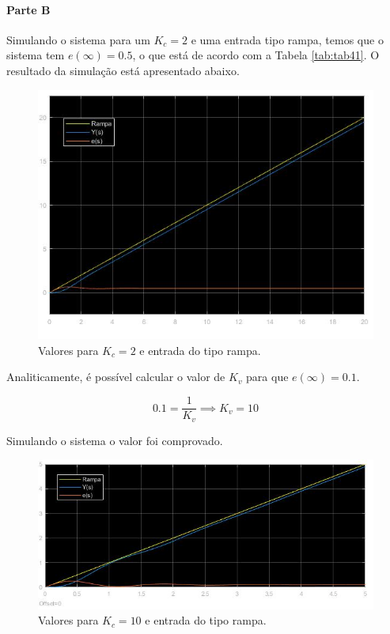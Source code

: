 \documentclass[
]{book}
\begin{document}
\hypertarget{parte-b-2}{%
\paragraph*{Parte B}\label{parte-b-2}}

Simulando o sistema para um \(K_c = 2\) e uma entrada tipo rampa, temos que o sistema tem \(e(\infty) = 0.5\), o que está de acordo com a Tabela \ref{tab:tab41}. O resultado da simulação está apresentado abaixo.

\begin{figure}
\includegraphics[width=0.8\linewidth]{Imagens/Lab4/Resolução/prob2B1} \caption{Valores para $K_c = 2$ e entrada do tipo rampa.}\label{fig:fig42B1}
\end{figure}

Analiticamente, é possível calcular o valor de \(K_v\) para que \(e(\infty) = 0.1\).

\[
0.1 = \frac {1}{K_v} \implies K_v = 10
\]

Simulando o sistema o valor foi comprovado.

\begin{figure}
\includegraphics[width=0.8\linewidth]{Imagens/Lab4/Resolução/prob2B2} \caption{Valores para $K_c = 10$ e entrada do tipo rampa.}\label{fig:fig42B2}
\end{figure}
\end{document}
